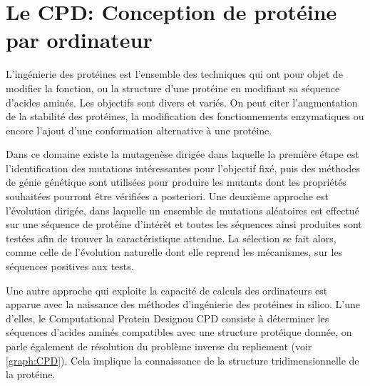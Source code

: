 \chapter{Le \og CPD\fg: Conception de protéine par ordinateur}
\label{chap:CPD}
L'ingénierie des protéines est l'ensemble des techniques qui ont pour objet de modifier la fonction, ou la structure d'une protéine en modifiant sa séquence d'acides aminés. Les objectifs sont divers et variés. On peut citer l'augmentation de la stabilité des protéines, la  modification des fonctionnements enzymatiques ou encore l'ajout d'une conformation alternative à une protéine.

Dans ce domaine existe la mutagenèse dirigée dans laquelle la première étape est l'identification des mutations intéressantes pour l'objectif fixé, puis des méthodes de génie génétique sont utilisées pour produire les mutants dont les propriétés souhaitées pourront être vérifiées a posteriori. Une deuxième approche est l'évolution dirigée, dans laquelle un ensemble de mutations aléatoires est effectué sur une séquence de protéine d'intérêt et toutes les séquences ainsi produites sont testées afin de trouver la caractéristique attendue. La sélection se fait alors, comme celle de l'évolution naturelle dont elle reprend les mécanismes, sur les séquences positives aux tests.

Une autre approche qui exploite la capacité de calculs des ordinateurs est apparue avec la naissance des méthodes d'ingénierie des protéines \og in silico\fg. L'une d'elles, le \og Computational Protein Design\fg ou CPD consiste à déterminer les séquences d'acides aminés compatibles avec une structure protéique donnée, on parle également de résolution du problème inverse du repliement (voir \ref{graph:CPD}). Cela implique la connaissance de la structure tridimensionnelle de la protéine. 

